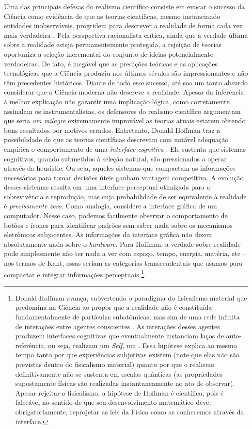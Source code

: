 \documentclass[./main.tex]{subfiles}
\begin{document}
\par Uma das principais defesas do realismo científico consiste em evocar o sucesso da Ciência como evidência de que as teorias científicas, mesmo instanciando entidades inobserváveis, progridem para descrever a realidade de forma cada vez mais verdadeira \cite{saatsi2017}. Pela perspectiva racionalista crítica, ainda que a verdade última sobre a realidade esteja permanentemente protegida, a rejeição de teorias oportuniza a seleção incremental do conjunto de ideias potencialmente verdadeiras. De fato, é inegável que as predições teóricas e as aplicações tecnológicas que a Ciência produziu nos últimos séculos são impressionantes e não têm precedentes históricos. Diante de todo esse sucesso, até soa um tanto absurdo considerar que a Ciência moderna não descreve a realidade. Apesar da inferência à melhor explicação não garantir uma implicação lógica, como corretamente assinalam os instrumentalistas, os defensores do realismo científico argumentam que seria \textit{um milagre} extremamente improvável as teorias atuais estarem obtendo bons resultados por motivos errados. Entretanto, Donald Hoffman traz a possibilidade de que as teorias científicas descrevam com notável adequação empírica o comportamento de uma \textit{interface cognitiva} \cite{Hoffman2015}. Ele sustenta que sistemas cognitivos, quando submetidos à seleção natural, são pressionados a operar através da \gls{heuristic}. Ou seja, aqueles sistemas que compactam as informações necessárias para tomar decisões úteis ganham vantagem competitiva. A evolução desses sistemas resulta em uma interface perceptual otimizada para a sobrevivência e reprodução, mas cuja probabilidade de ser equivalente à realidade é \textit{precisamente zero}. Como analogia, considere a interface gráfica de um computador. Nesse caso, podemos facilmente observar o comportamento de botões e ícones para identificar padrões sem saber nada sobre os mecanismos eletrônicos subjacentes. As informações da interface gráfica não dizem absolutamente nada sobre o \textit{hardware}.  Para Hoffman, a verdade sobre realidade pode simplesmente não ter nada a ver com espaço, tempo, energia, matéria, etc -- nos termos de Kant, essas seriam as categorias transcendentais que usamos para compactar e integrar informações perceptuais \footnote{Donald Hoffman avança, subvertendo o paradigma do fisicalismo material que predomina na Ciência ao propor que a realidade não é constituída fundamentalmente de partículas subatômicas, mas sim de uma rede infinita de interações entre agentes conscientes \cite{Hoffman2023}. As interações desses agentes produzem interfaces cognitivas que eventualmente instanciam laços de auto-referência, ou seja, realizam um \textit{Self}, um . Essa hipótese explica ao mesmo tempo tanto por que experiências subjetivas existem (note que elas não são previstas dentro do fisicalismo material) quanto por que o realismo definitivamente não se sustenta em escalas quânticas (as propriedades supostamente físicas são realizadas instantaneamente no ato de observar). Apesar rejeitar o fisicalismo, a hipótese de Hoffman é científica, pois é falseável no sentido de que seu desenvolvimento matemático deve, obrigatoriamente, reprojetar as leis da Física como as conhecemos através da interface.}.  
\end{document}
